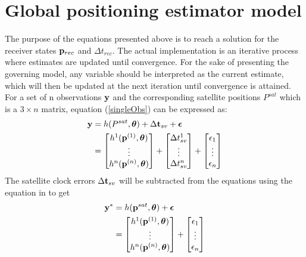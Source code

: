 \section{Global positioning estimator model}\label{stateEst}
The purpose of the equations presented above is to reach a solution for the receiver states ${\bf p}_{rec}$ and $\Delta t_{rec}$.
The actual implementation is an iterative process where estimates are updated until convergence. For the sake of presenting the governing model, any variable should be interpreted as the current estimate, which will then be updated at the next iteration until convergence is attained.
For a set of n observations ${\bf y}$ and the corresponding satellite positions $P^{sat}$ which is a $3\times n$ matrix, equation (\ref{singleObs}) can be expressed as:
\begin{align}
\textbf{y}&=h(P^{sat},{\boldsymbol \theta})+\Delta {\bf t}_{sv}+ {\boldsymbol \epsilon}\\
		  &=\begin{bmatrix} 
		  h^1({\bf p}^{(1)},{\boldsymbol \theta})\\ 
		  \vdots \\ 
		  h^n({\bf p}^{(n)},{\boldsymbol \theta}) \end{bmatrix} + \begin{bmatrix}
		  \Delta t_{sv}^1 \\ \vdots \\ \Delta t_{sv}^n
		  \end{bmatrix}+ \begin{bmatrix}
		  \epsilon_1 \\ \vdots \\ \epsilon_n
		  \end{bmatrix}
\end{align}
The satellite clock errors $\Delta {\bf t}_{sv}$ will be subtracted from the equations using the equation in \cite{dunn2012global} to get
\begin{align}
{\bf y}^*&=h({\bf p}^{sat},{\boldsymbol \theta})+ {\boldsymbol \epsilon}\\
		  &=\begin{bmatrix} 
		  h^1({\bf p}^{(1)},{\boldsymbol \theta})\\ 
		  \vdots \\ 
		  h^n({\bf p}^{(n)},{\boldsymbol \theta}) \end{bmatrix} +
		  \begin{bmatrix}
		  \epsilon_1 \\ \vdots \\ \epsilon_n
		  \end{bmatrix} \label{linearised}
\end{align}

